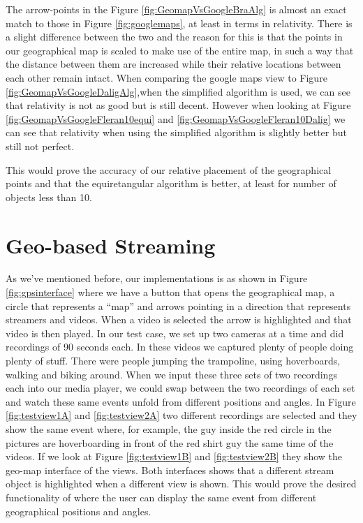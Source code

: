 The arrow-points in the Figure \ref{fig:GeomapVsGoogleBraAlg} is almost an exact match to those in Figure \ref{fig:googlemaps}, at least in terms in relativity. There is a slight difference between the two and the reason for this is that the points in our geographical map is scaled to make use of the entire map, in such a way that the distance between them are increased while their relative locations between each other remain intact. When comparing the google maps view to Figure \ref{fig:GeomapVsGoogleDaligAlg},when the simplified algorithm is used, we can see that relativity is not as good but is still decent. However when looking at Figure \ref{fig:GeomapVsGoogleFleran10equi} and \ref{fig:GeomapVsGoogleFleran10Dalig} we can see that relativity when using the simplified algorithm is slightly better but still not perfect. 

This would prove the accuracy of our relative placement of the geographical points and that the equiretangular algorithm is better, at least for number of objects less than 10.

\section{Geo-based Streaming}
\label{sec:geobasedstreaming}

As we’ve mentioned before, our implementations is as shown in Figure \ref{fig:gpsinterface} where we have a button that opens the geographical map, a circle that represents a “map” and arrows pointing in a direction that represents streamers and videos. When a video is selected the arrow is highlighted and that video is then played. In our test case, we set up two cameras at a time and did recordings of 90 seconds each. In these videos we captured plenty of people doing plenty of stuff. There were people jumping the trampoline, using hoverboards, walking and biking around. When we input these three sets of two recordings each into our media player, we could swap between the two recordings of each set and watch these same events unfold from different positions and angles. In Figure \ref{fig:testview1A} and \ref{fig:testview2A} two different recordings are selected and they show the same event where, for example, the guy inside the red circle in the pictures are hoverboarding in front of the red shirt guy the same time of the videos. If we look at Figure \ref{fig:testview1B} and \ref{fig:testview2B} they show the geo-map interface of the views. Both interfaces shows that a different stream object is highlighted when a different view is shown. This would prove the desired functionality of where the user can display the same event from different geographical positions and angles.

